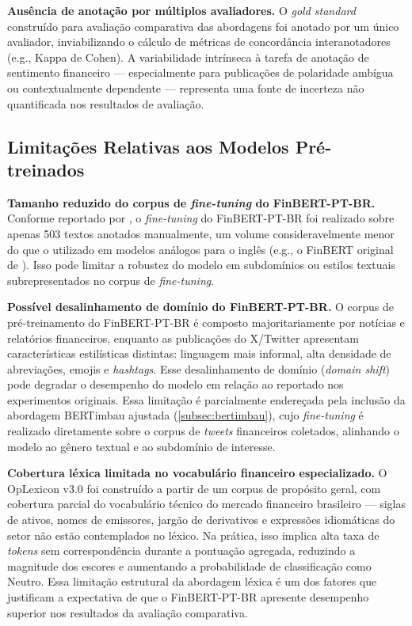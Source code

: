 \textbf{Ausência de anotação por múltiplos avaliadores.} O \textit{gold standard} construído para avaliação comparativa das abordagens foi anotado por um único avaliador, inviabilizando o cálculo de métricas de concordância interanotadores (e.g., Kappa de Cohen). A variabilidade intrínseca à tarefa de anotação de sentimento financeiro — especialmente para publicações de polaridade ambígua ou contextualmente dependente — representa uma fonte de incerteza não quantificada nos resultados de avaliação.


\subsection{Limitações Relativas aos Modelos Pré-treinados}
\label{subsec:lim_modelo}

\textbf{Tamanho reduzido do corpus de \textit{fine-tuning} do FinBERT-PT-BR.} Conforme reportado por , o \textit{fine-tuning} do FinBERT-PT-BR foi realizado sobre apenas 503 textos anotados manualmente, um volume consideravelmente menor do que o utilizado em modelos análogos para o inglês (e.g., o FinBERT original de ). Isso pode limitar a robustez do modelo em subdomínios ou estilos textuais subrepresentados no corpus de \textit{fine-tuning}.

\textbf{Possível desalinhamento de domínio do FinBERT-PT-BR.} O corpus de pré-treinamento do FinBERT-PT-BR é composto majoritariamente por notícias e relatórios financeiros, enquanto as publicações do X/Twitter apresentam características estilísticas distintas: linguagem mais informal, alta densidade de abreviações, emojis e \textit{hashtags}. Esse desalinhamento de domínio (\textit{domain shift}) pode degradar o desempenho do modelo em relação ao reportado nos experimentos originais. Essa limitação é parcialmente endereçada pela inclusão da abordagem BERTimbau ajustada (\autoref{subsec:bertimbau}), cujo \textit{fine-tuning} é realizado diretamente sobre o corpus de \textit{tweets} financeiros coletados, alinhando o modelo ao gênero textual e ao subdomínio de interesse.

\textbf{Cobertura léxica limitada no vocabulário financeiro especializado.} O OpLexicon v3.0 foi construído a partir de um corpus de propósito geral, com cobertura parcial do vocabulário técnico do mercado financeiro brasileiro — siglas de ativos, nomes de emissores, jargão de derivativos e expressões idiomáticas do setor não estão contemplados no léxico. Na prática, isso implica alta taxa de \textit{tokens} sem correspondência durante a pontuação agregada, reduzindo a magnitude dos escores e aumentando a probabilidade de classificação como Neutro. Essa limitação estrutural da abordagem léxica é um dos fatores que justificam a expectativa de que o FinBERT-PT-BR apresente desempenho superior nos resultados da avaliação comparativa.


